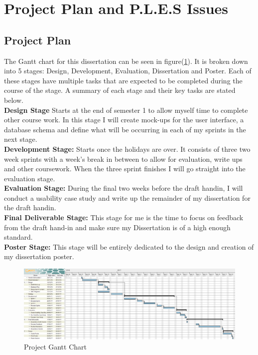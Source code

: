\documentclass[12pt]{article}  %
\begin{document}
\newpage

\section{Project Plan and P.L.E.S Issues}

\subsection{Project Plan}

The Gantt chart for this dissertation can be seen in figure(\ref{fig:ganttchart}). It is broken down into 5 stages: Design, Development, Evaluation, Dissertation and Poster. Each of these stages have multiple tasks that are expected to be completed during the course of the stage. A summary of each stage and their key tasks are stated below. \\
\textbf{Design Stage} Starts at the end of semester 1 to allow myself time to complete other course work. In this stage I will create mock-ups for the user interface, a database schema and define what will be occurring in each of my sprints in the next stage.\\
\textbf{Development Stage:} Starts once the holidays are over. It consists of three two week sprints with  a week's break in between to allow for evaluation, write ups and other coursework. When the three sprint finishes I will go straight into the evaluation stage.\\
\textbf{Evaluation Stage: } During the final two weeks before the draft handin, I will conduct a usability case study and write up the remainder of my dissertation for the draft handin.\\
\textbf{Final Deliverable Stage:} This stage  for me is the time to focus on feedback from the draft hand-in and make sure my Dissertation is of a high enough standard.\\
\textbf{Poster Stage:} This stage will be entirely dedicated to the design and creation of my dissertation poster.

\begin{figure}[!htbp]

\includegraphics[width=\textwidth]{images/ganttchart.png}
\caption{Project Gantt Chart}
\label{fig:ganttchart}

\end{figure}
\end{document}
